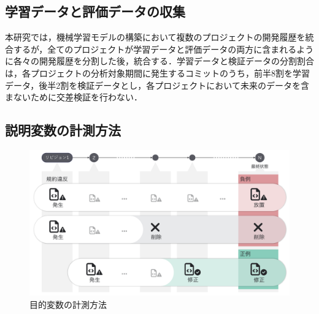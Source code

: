 \documentclass[T,J]{fose} %
\begin{document}

\subsection{学習データと評価データの収集}

本研究では，機械学習モデルの構築において複数のプロジェクトの開発履歴を統合するが，全てのプロジェクトが学習データと評価データの両方に含まれるように各々の開発履歴を分割した後，統合する．学習データと検証データの分割割合は，各プロジェクトの分析対象期間に発生するコミットのうち，前半8割を学習データ，後半2割を検証データとし，各プロジェクトにおいて未来のデータを含まないために交差検証を行わない．

\subsection{説明変数の計測方法}

\begin{figure}[t]
	\centering
	\includegraphics[width=1.0\linewidth]{Kameoka_fig/kameoka_fig2.pdf}
	\caption{目的変数の計測方法}
	\label{fig:mokutekihensu}
\end{figure}
\end{document}
